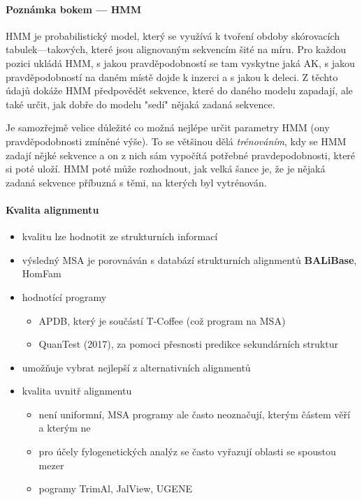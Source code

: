 \documentclass[DIV=8]{scrreprt}
\newcommand{\mybox}[2]{
    \paragraph{#1} #2
}
\begin{document}
\mybox{Poznámka bokem --- HMM}{HMM je probabilistický model, který se využívá k tvoření obdoby skórovacích tabulek---takových, které jsou alignovaným sekvencím šité na míru. Pro každou pozici ukládá HMM, s jakou pravděpodobností se tam vyskytne jaká AK, s jakou pravděpodobností na daném místě dojde k inzerci a s jakou k deleci. Z těchto údajů dokáže HMM předpovědět sekvence, které do daného modelu zapadají, ale také určit, jak dobře do modelu "sedí" nějaká zadaná sekvence.

Je samozřejmě velice důležité co možná nejlépe určit parametry HMM (ony pravděpodobnosti zmíněné výše). To se většinou dělá \emph{trénováním}, kdy se HMM zadají nějké sekvence a on z nich sám vypočítá potřebné pravdepodobnosti, které si poté uloží. HMM poté může rozhodnout, jak velká šance je, že je nějaká zadaná sekvence příbuzná s těmi, na kterých byl vytrénován.}


\paragraph{Kvalita alignmentu}
\begin{itemize}[nosep]
    \item kvalitu lze hodnotit ze strukturních informací
    \item výsledný MSA je porovnáván s databází strukturních alignmentů \textbf{BALiBase}, HomFam
    \item hodnotící programy
\begin{itemize}[nosep]
    \item APDB, který je součástí T-Coffee (což program na MSA)
    \item QuanTest (2017), za pomoci přesnosti predikce sekundárních struktur
\end{itemize}

    \item umožňuje vybrat nejlepší z alternativních alignmentů
    \item kvalita uvnitř alignmentu
\begin{itemize}[nosep]
    \item není uniformní, MSA programy ale často neoznačují, kterým částem věří a kterým ne
    \item pro účely fylogenetických analýz se často vyřazují oblasti se spoustou mezer
    \item pogramy TrimAl, JalView, UGENE
\end{itemize}

\end{itemize}
\end{document}
